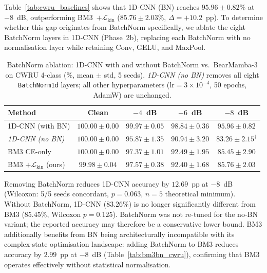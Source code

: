 Table~\ref{tab:cwru_baselines} shows that 1D-CNN (BN) reaches
$95.96 \pm 0.82\%$ at $-8$~dB, outperforming BM3~$+\mathcal{L}_{\text{kin}}$
($85.76 \pm 2.03\%$, $\Delta = +10.2$~pp).
To determine whether this gap originates from BatchNorm specifically, we
ablate the eight BatchNorm layers in 1D-CNN (Phase~2b), replacing each
BatchNorm with no normalisation layer while retaining Conv, GELU, and MaxPool.

\begin{table}[htbp]
\centering
\caption{BatchNorm ablation: 1D-CNN with and without BatchNorm vs.\
         BearMamba-3 on CWRU 4-class (\%, mean $\pm$ std, 5 seeds).
         \textit{1D-CNN (no BN)} removes all eight \texttt{BatchNorm1d} layers;
         all other hyperparameters ($\text{lr}=3\times10^{-4}$, 50 epochs,
         AdamW) are unchanged.}
\label{tab:bn_ablation}
\begin{tabular}{lcccc}
\toprule
Method & Clean & $-4$~dB & $-6$~dB & $-8$~dB \\
\midrule
1D-CNN (with BN)                                      & $100.00 \pm 0.00$ & $99.97 \pm 0.05$ & $98.84 \pm 0.36$ & $95.96 \pm 0.82$ \\
\textit{1D-CNN (no BN)}                               & $100.00 \pm 0.00$ & $95.87 \pm 1.35$ & $90.94 \pm 3.20$ & $83.26 \pm 2.15^{\dagger}$ \\
BM3 CE-only                                           & $100.00 \pm 0.00$ & $97.37 \pm 1.01$ & $92.49 \pm 1.95$ & $85.45 \pm 2.90$ \\
BM3 $+\mathcal{L}_{\text{kin}}$ (ours)               & $99.98 \pm 0.04$  & $97.57 \pm 0.38$ & $92.40 \pm 1.68$ & $85.76 \pm 2.03$ \\
\bottomrule
\end{tabular}
\begin{tablenotes}
\item[$\dagger$] Removing BatchNorm reduces 1D-CNN accuracy by
  $12.69$~pp at $-8$~dB (Wilcoxon: 5/5 seeds concordant, $p = 0.063$,
  $n=5$ theoretical minimum).
  Without BatchNorm, 1D-CNN ($83.26\%$) is no longer significantly
  different from BM3 ($85.45\%$, Wilcoxon $p = 0.125$).
  BatchNorm was not re-tuned for the no-BN variant; the reported accuracy
  may therefore be a conservative lower bound.
  BM3 additionally benefits from BN being architecturally incompatible
  with its complex-state optimisation landscape:
  adding BatchNorm to BM3 reduces accuracy by $2.99$~pp at $-8$~dB
  (Table~\ref{tab:bm3bn_cwru}), confirming that BM3 operates effectively
  without statistical normalisation.
\end{tablenotes}
\end{table}

